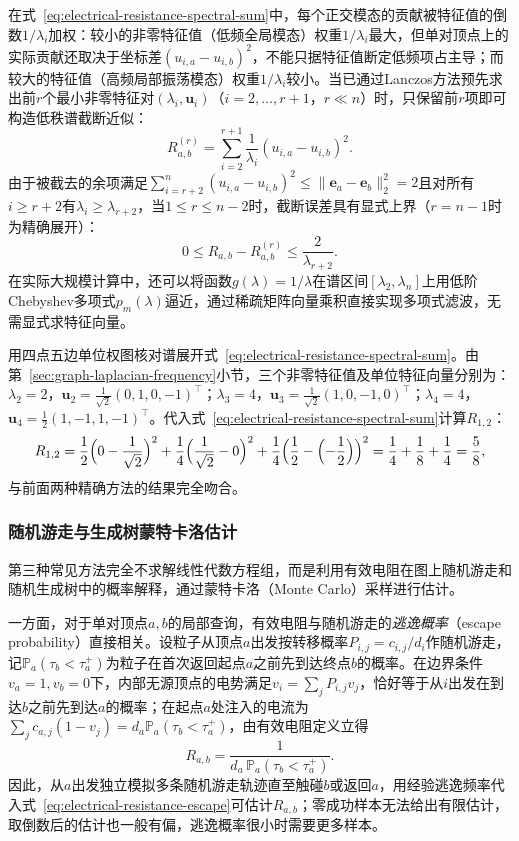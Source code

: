 在式~\eqref{eq:electrical-resistance-spectral-sum}中，每个正交模态的贡献被特征值的倒数$1/\lambda_i$加权：较小的非零特征值（低频全局模态）权重$1/\lambda_i$最大，但单对顶点上的实际贡献还取决于坐标差$(u_{i,a}-u_{i,b})^2$，不能只据特征值断定低频项占主导；而较大的特征值（高频局部振荡模态）权重$1/\lambda_i$较小。当已通过Lanczos方法预先求出前$r$个最小非零特征对$(\lambda_i,\bm u_i)$（$i=2,\ldots,r+1$，$r\ll n$）时，只保留前$r$项即可构造低秩谱截断近似：
\[
  R_{a,b}^{(r)} = \sum_{i=2}^{r+1}\frac{1}{\lambda_i}(u_{i,a} - u_{i,b})^2.
\]
由于被截去的余项满足$\sum_{i=r+2}^n(u_{i,a}-u_{i,b})^2 \leq \lVert\bm e_a - \bm e_b\rVert_2^2 = 2$且对所有$i\geq r+2$有$\lambda_i\geq\lambda_{r+2}$，当$1\leq r\leq n-2$时，截断误差具有显式上界（$r=n-1$时为精确展开）：
\[
  0 \leq R_{a,b} - R_{a,b}^{(r)} \leq \frac{2}{\lambda_{r+2}}.
\]
在实际大规模计算中，还可以将函数$g(\lambda)=1/\lambda$在谱区间$[\lambda_2,\lambda_n]$上用低阶Chebyshev多项式$p_m(\lambda)$逼近，通过稀疏矩阵向量乘积直接实现多项式滤波，无需显式求特征向量。

用四点五边单位权图核对谱展开式~\eqref{eq:electrical-resistance-spectral-sum}。由第~\ref{sec:graph-laplacian-frequency}小节，三个非零特征值及单位特征向量分别为：$\lambda_2=2$，$\bm u_2=\frac{1}{\sqrt 2}(0,1,0,-1)^\top$；$\lambda_3=4$，$\bm u_3=\frac{1}{\sqrt 2}(1,0,-1,0)^\top$；$\lambda_4=4$，$\bm u_4=\frac12(1,-1,1,-1)^\top$。代入式~\eqref{eq:electrical-resistance-spectral-sum}计算$R_{1,2}$：
\[
  R_{1,2}
  = \frac{1}{2}\Bigl(0 - \frac{1}{\sqrt 2}\Bigr)^2
    + \frac{1}{4}\Bigl(\frac{1}{\sqrt 2} - 0\Bigr)^2
    + \frac{1}{4}\Bigl(\frac12 - \Bigl(-\frac12\Bigr)\Bigr)^2
  = \frac{1}{4} + \frac{1}{8} + \frac{1}{4} = \frac{5}{8},
\]
与前面两种精确方法的结果完全吻合。

\subsubsection{随机游走与生成树蒙特卡洛估计}
\label{sec:electrical-resistance-monte-carlo}

第三种常见方法完全不求解线性代数方程组，而是利用有效电阻在图上随机游走和随机生成树中的概率解释，通过蒙特卡洛（Monte Carlo）采样进行估计。

一方面，对于单对顶点$a,b$的局部查询，有效电阻与随机游走的\emph{逃逸概率}（escape probability）直接相关。设粒子从顶点$a$出发按转移概率$P_{i,j}=c_{i,j}/d_i$作随机游走，记$\mathbb P_a(\tau_b < \tau_a^+)$为粒子在首次返回起点$a$之前先到达终点$b$的概率。在边界条件$v_a=1, v_b=0$下，内部无源顶点的电势满足$v_i=\sum_j P_{i,j}v_j$，恰好等于从$i$出发在到达$b$之前先到达$a$的概率；在起点$a$处注入的电流为$\sum_j c_{a,j}(1-v_j) = d_a\mathbb P_a(\tau_b < \tau_a^+)$，由有效电阻定义立得
\begin{equation}
  R_{a,b} = \frac{1}{d_a\,\mathbb P_a(\tau_b < \tau_a^+)}.
  \label{eq:electrical-resistance-escape}
\end{equation}
因此，从$a$出发独立模拟多条随机游走轨迹直至触碰$b$或返回$a$，用经验逃逸频率代入式~\eqref{eq:electrical-resistance-escape}可估计$R_{a,b}$；零成功样本无法给出有限估计，取倒数后的估计也一般有偏，逃逸概率很小时需要更多样本。

